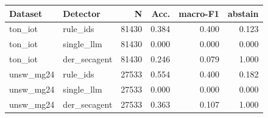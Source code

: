 \begin{tabular}{llrrrr}
\toprule
Dataset & Detector & N & Acc. & macro-F1 & abstain \\
\midrule
ton\_iot & rule\_ids & 81430 & 0.384 & 0.400 & 0.123 \\
ton\_iot & single\_llm & 81430 & 0.000 & 0.000 & 0.000 \\
ton\_iot & der\_secagent & 81430 & 0.246 & 0.079 & 1.000 \\
unsw\_mg24 & rule\_ids & 27533 & 0.554 & 0.400 & 0.182 \\
unsw\_mg24 & single\_llm & 27533 & 0.000 & 0.000 & 0.000 \\
unsw\_mg24 & der\_secagent & 27533 & 0.363 & 0.107 & 1.000 \\
\bottomrule
\end{tabular}
